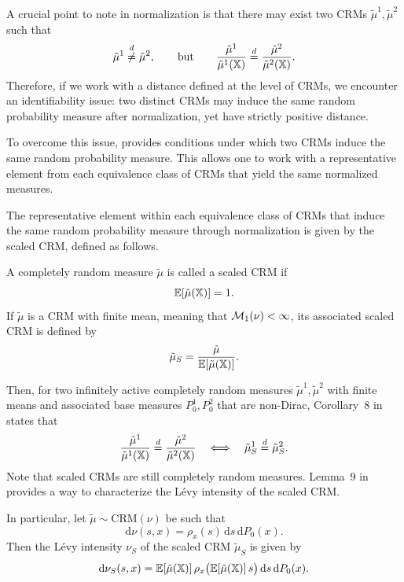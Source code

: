 A crucial point to note in normalization is that there may exist two CRMs $\tilde{\mu}^1, \tilde{\mu}^2$ such that
\[
\tilde{\mu}^1 \overset{d}{\neq} \tilde{\mu}^2, \qquad \text{but} \qquad \frac{\tilde{\mu}^1}{\tilde{\mu}^1(\mathbb{X})} \overset{d}{=} \frac{\tilde{\mu}^2}{\tilde{\mu}^2(\mathbb{X})}.
\]
Therefore, if we work with a distance defined at the level of CRMs, we encounter an identifiability issue: two distinct CRMs may induce the same random probability measure after normalization, yet have strictly positive distance.

To overcome this issue, \cite{catalano2026merging} provides conditions under which two CRMs induce the same random probability measure. This allows one to work with a representative element from each equivalence class of CRMs that yield the same normalized measures.

The representative element within each equivalence class of CRMs that induce the same random probability measure through normalization is given by the scaled CRM, defined as follows.
\begin{definition}
A completely random measure $\tilde{\mu}$ is called a scaled CRM if
\[
\mathbb{E}[\tilde{\mu}(\mathbb{X})] = 1.
\]
If $\tilde{\mu}$ is a CRM with finite mean, meaning that $\mathcal{M}_1(\nu) < \infty$, its associated scaled CRM is defined by
\[
\tilde{\mu}_S = \frac{\tilde{\mu}}{\mathbb{E}[\tilde{\mu}(\mathbb{X})]}.
\]
\end{definition}

Then, for two infinitely active completely random measures $\tilde{\mu}^1, \tilde{\mu}^2$ with finite means and associated base measures $P_0^1, P_0^2$ that are non-Dirac, Corollary~8 in \cite{catalano2026merging} states that
\[
\frac{\tilde{\mu}^1}{\tilde{\mu}^1(\mathbb{X})} \overset{d}{=} \frac{\tilde{\mu}^2}{\tilde{\mu}^2(\mathbb{X})} \quad \Longleftrightarrow \quad \tilde{\mu}^1_S \overset{d}{=} \tilde{\mu}^2_S.
\]
Note that scaled CRMs are still completely random measures. Lemma~9 in \cite{catalano2026merging} provides a way to characterize the L\'evy intensity of the scaled CRM.

In particular, let $\tilde{\mu} \sim \mathrm{CRM}(\nu)$ be such that
\[
\mathrm{d}\nu(s,x) = \rho_x(s)\,\mathrm{d}s\,\mathrm{d}P_0(x).
\]
Then the L\'evy intensity $\nu_S$ of the scaled CRM $\tilde{\mu}_S$ is given by
\[
\mathrm{d}\nu_S(s,x) = \mathbb{E}[\tilde{\mu}(\mathbb{X})] \, \rho_x\bigl(\mathbb{E}[\tilde{\mu}(\mathbb{X})]\, s\bigr)\,\mathrm{d}s\,\mathrm{d}P_0(x).
\]







